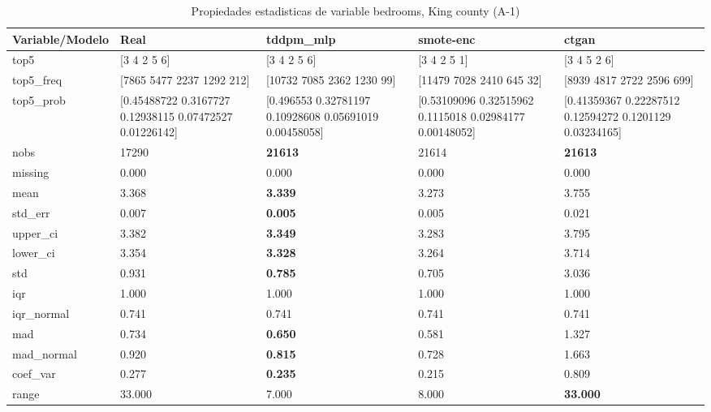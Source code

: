 \begin{table}[H]
\centering
\fontsize{8}{14}\selectfont
\caption{Propiedades  estadisticas de variable bedrooms, King county (A-1)}
\label{table-stats-king county-a-1-bedrooms}
\begin{tabular}{|l|m{10em}|m{10em}|m{10em}|m{10em}|}
\hline
 \rowcolor[gray]{0.8}
Variable/Modelo & Real & tddpm\_mlp & smote-enc & ctgan \\
\hline top5 & [3 4 2 5 6] & [3 4 2 5 6] & [3 4 2 5 1] & [3 4 5 2 6] \\
\hline top5\_freq & [7865 5477 2237 1292  212] & [10732  7085  2362  1230    99] & [11479  7028  2410   645    32] & [8939 4817 2722 2596  699] \\
\hline top5\_prob & [0.45488722 0.3167727  0.12938115 0.07472527 0.01226142] & [0.496553   0.32781197 0.10928608 0.05691019 0.00458058] & [0.53109096 0.32515962 0.1115018  0.02984177 0.00148052] & [0.41359367 0.22287512 0.12594272 0.1201129  0.03234165] \\
\hline nobs & 17290 & \bfseries 21613 & \cellcolor[rgb]{0.9, 0.54, 0.52} 21614 & \bfseries 21613 \\
\hline missing & 0.000 & 0.000 & 0.000 & 0.000 \\
\hline mean & 3.368 & \bfseries 3.339 & 3.273 & \cellcolor[rgb]{0.9, 0.54, 0.52} 3.755 \\
\hline std\_err & 0.007 & \bfseries 0.005 & 0.005 & \cellcolor[rgb]{0.9, 0.54, 0.52} 0.021 \\
\hline upper\_ci & 3.382 & \bfseries 3.349 & 3.283 & \cellcolor[rgb]{0.9, 0.54, 0.52} 3.795 \\
\hline lower\_ci & 3.354 & \bfseries 3.328 & 3.264 & \cellcolor[rgb]{0.9, 0.54, 0.52} 3.714 \\
\hline std & 0.931 & \bfseries 0.785 & 0.705 & \cellcolor[rgb]{0.9, 0.54, 0.52} 3.036 \\
\hline iqr & 1.000 & 1.000 & 1.000 & 1.000 \\
\hline iqr\_normal & 0.741 & 0.741 & 0.741 & 0.741 \\
\hline mad & 0.734 & \bfseries 0.650 & 0.581 & \cellcolor[rgb]{0.9, 0.54, 0.52} 1.327 \\
\hline mad\_normal & 0.920 & \bfseries 0.815 & 0.728 & \cellcolor[rgb]{0.9, 0.54, 0.52} 1.663 \\
\hline coef\_var & 0.277 & \bfseries 0.235 & 0.215 & \cellcolor[rgb]{0.9, 0.54, 0.52} 0.809 \\
\hline range & 33.000 & \cellcolor[rgb]{0.9, 0.54, 0.52} 7.000 & 8.000 & \bfseries 33.000 \\

\end{tabular}
\end{table}
